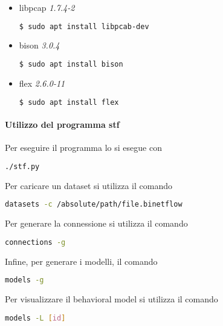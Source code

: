 \documentclass[11pt,a4paper,twoside,openright]{book}
\begin{document}
\begin{itemize}
				\item libpcap \textit{1.7.4-2}
\begin{lstlisting}[language=bash]
$ sudo apt install libpcab-dev
\end{lstlisting}

\item bison \textit{3.0.4}
\begin{lstlisting}[language=bash]
$ sudo apt install bison
\end{lstlisting}

\item flex \textit{2.6.0-11}
\begin{lstlisting}[language=bash]
$ sudo apt install flex
\end{lstlisting}

\end{itemize}

\paragraph{Utilizzo del programma stf\\}
Per eseguire il programma lo si esegue con
\begin{lstlisting}[language=bash]
	./stf.py
\end{lstlisting}

Per caricare un dataset si utilizza il comando
\begin{lstlisting}[language=bash]
	datasets -c /absolute/path/file.binetflow	
\end{lstlisting}

Per generare la connessione si utilizza il comando
\begin{lstlisting}[language=bash]
	connections -g	
\end{lstlisting}

Infine, per generare i modelli, il comando
\begin{lstlisting}[language=bash]
	models -g	
\end{lstlisting}

Per visualizzare il behavioral model si utilizza il comando
\begin{lstlisting}[language=bash]
	models -L [id]	
\end{lstlisting}
\end{document}
